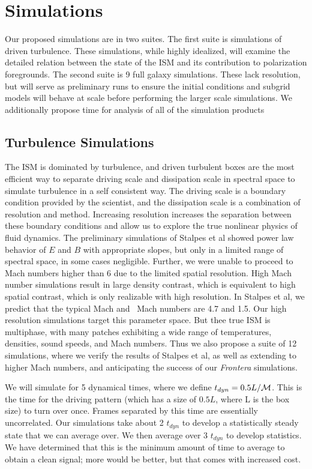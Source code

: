 \section{Simulations}
\label{sec.simulations}

Our proposed simulations are in two suites.  The first suite is 
simulations of driven turbulence.  These simulations, while highly idealized,
will examine the detailed relation between the state of the ISM and its
contribution to polarization foregrounds.  The second suite is 9 full galaxy
simulations.  These lack resolution, but will serve as preliminary runs to
ensure the initial conditions and subgrid models will behave at scale before
performing the larger scale simulations.  We additionally propose time for
analysis of all of the simulation products

\subsection{Turbulence Simulations}

The ISM is dominated by turbulence, and driven turbulent boxes are the most
efficient way to separate driving scale and dissipation scale in spectral space
to simulate turbulence in a self consistent way.  
The driving scale is a boundary condition provided
by the scientist, and the dissipation scale is a combination of
resolution and method.  Increasing resolution increases the separation between
these boundary conditions and allow us to explore the true nonlinear physics of
fluid dynamics.  The preliminary simulations of Stalpes et al showed
power law behavior of $E$ and $B$ with appropriate slopes, but only in a limited range of spectral
space, in some cases negligible.  Further, we were unable to proceed to Mach
numbers higher than 6 due to the limited spatial resolution.  
High Mach number simulations result in large density contrast, which is
equivalent to high spatial contrast, which is only realizable with high
resolution.  In Stalpes et al, we predict that the typical Mach and \alf\ Mach
numbers are 4.7 and 1.5.  Our high resolution simulations target this parameter
space.  But thee true ISM is multiphase, with many patches exhibiting a wide
range of temperatures, densities, sound speeds, and Mach numbers.  Thus we also
propose a suite of 12 simulations, where we verify the results of Stalpes et al,
as well as extending to higher Mach numbers, and anticipating the success of our
\emph{Frontera} simulations.  

We will simulate for 5 dynamical times, where we define $t_{dyn}=0.5 L/\mathcal{M}$.
This is the time for the driving pattern (which has a size of $0.5 L$, where L
is the box size) to turn over once.  Frames separated by this time are
essentially uncorrelated.  Our simulations take about 2 $t_{dyn}$ to develop a
statistically steady state that we can average over.  We then average over 3
$t_{dyn}$ to develop statistics.  We have determined that this is the minimum
amount of time to average to obtain a clean signal;  more would be better, but
that comes with increased cost.

